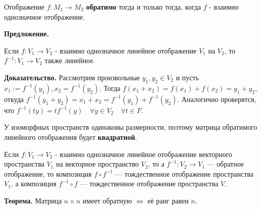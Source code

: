 \documentclass[a4paper]{article}
\begin{document}
\newpage \begin{center}
                 \begin{Large}
                 \end{Large}
         \end{center} 
         
         Отображение $f: M_1 \rightarrow M_2$ \textbf{обратимо} тогда и только тогда, когда $f$ - взаимно однозначное отображение.
         
         \begin{htheorem}
         	\textbf{Предложение.}
         	
         	Если $f: V_1 \rightarrow V_2$ - взаимно однозначное линейное отображение $V_1$ на $V_2$, то $f^{-1}: V_1 \rightarrow V_2$ также линейное.
         \end{htheorem}
         
         \begin{hproof}
         \textbf{Доказательство.} Рассмотрим произвольные $y_1, y_2 \in V_2$ и пусть $x_1 := f^{-1}(y_1), x_2 = f^{-1}(y_2)$. Тогда $f(x_1+x_2) = f(x_1)+f(x_2) = y_1+y_2$, откуда $f^{-1}(y_1+y_2) = x_1+x_2 = f^{-1}(y_1) + f^{-1}(y_2)$. Аналогично проверятся, что $f^{-1}(ty) = tf^{-1}(y) \quad \forall y \in V_2 \quad \forall t \in F$.
         \end{hproof}
                 
         У изоморфных пространств одинаковы размерности, поэтому матрица обратимого линейного отображения будет \textbf{квадратной}.
         
         
          Если $f: V_1 \rightarrow V_2$ - взаимно однозначное линейное отображение векторного пространства $V_1$ на векторное пространство $V_2$, то а $f^{-1}: V_2 \rightarrow V_1$ — обратное отображение, то композиция $f \circ f^{-1}$ —
тождественное отображение пространства $V_1$, а композиция $f^{-1} \circ f$ —
тождественное отображение пространства $V$.

\begin{htheorem}
\textbf{Теорема.} Матрица $n \times n$ имеет обратную $\Leftrightarrow$ её ранг равен $n$.
\end{htheorem}
\end{document}
